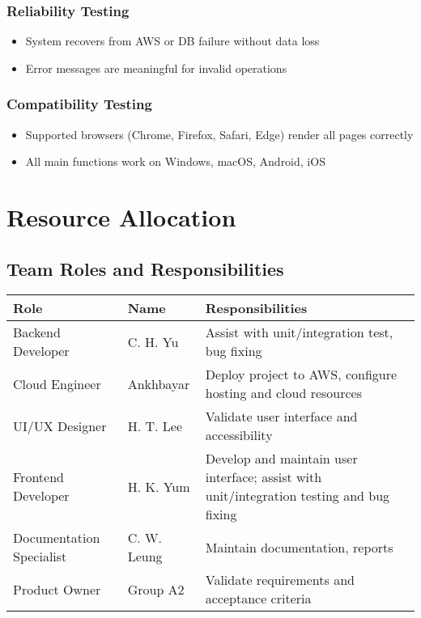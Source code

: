 \documentclass[a4paper,11pt]{scrartcl}
\begin{document}
\subsubsection{Reliability Testing}
\begin{itemize}[leftmargin=*]
    \item System recovers from AWS or DB failure without data loss
    \item Error messages are meaningful for invalid operations
\end{itemize}

\subsubsection{Compatibility Testing}
\begin{itemize}[leftmargin=*]
    \item Supported browsers (Chrome, Firefox, Safari, Edge) render all pages correctly
    \item All main functions work on Windows, macOS, Android, iOS
\end{itemize}

\section{Resource Allocation}

\subsection{Team Roles and Responsibilities}
\begin{tabularx}{\textwidth}{l l X}
\toprule
Role & Name & Responsibilities \\
\midrule
Backend Developer & C. H. Yu & Assist with unit/integration test, bug fixing \\
Cloud Engineer & Ankhbayar & Deploy project to AWS, configure hosting and cloud resources \\
UI/UX Designer & H. T. Lee & Validate user interface and accessibility \\
Frontend Developer & H. K. Yum & Develop and maintain user interface; assist with unit/integration testing and bug fixing \\
Documentation Specialist & C. W. Leung & Maintain documentation, reports \\
Product Owner & Group A2 & Validate requirements and acceptance criteria \\
\bottomrule
\end{tabularx}
\end{document}
